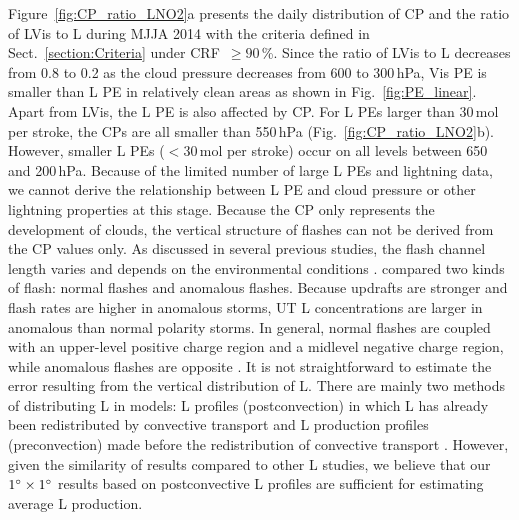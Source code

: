 \documentclass[amt]{copernicus}
\begin{document}
Figure~\ref{fig:CP_ratio_LNO2}a presents the daily distribution of CP and the ratio of LVis to L during MJJA 2014 with the criteria defined in Sect.~\ref{section:Criteria} under CRF~$\geq 90$\,{\%}.
Since the ratio of LVis to L decreases from 0.8 to 0.2 as the cloud pressure decreases from 600 to 300\,hPa, Vis PE is smaller than L PE in relatively clean areas as shown in Fig.~\ref{fig:PE_linear}.
Apart from LVis, the L PE is also affected by CP.
For L PEs larger than 30\,mol per stroke, the CPs are all smaller than 550\,hPa (Fig.~\ref{fig:CP_ratio_LNO2}b).
However, smaller L PEs ($< 30$\,mol per stroke) occur on all levels between 650 and 200\,hPa.
Because of the limited number of large L PEs and lightning data, we cannot derive the relationship between L PE and cloud pressure or other lightning properties at this stage.
Because the CP only represents the development of clouds, the vertical structure of flashes can not be derived from the CP values only.
As discussed in several previous studies, the flash channel length varies and depends on the environmental conditions \citep{Carey.2016,Mecikalski.2017,Fuchs.2018}.
\citet{Davis.2019} compared two kinds of flash: normal flashes and anomalous flashes.
Because updrafts are stronger and flash rates are higher in anomalous storms, UT L concentrations are larger in anomalous than normal polarity storms.
In general, normal flashes are coupled with an upper-level positive charge region and a midlevel negative charge region, while anomalous flashes are opposite \citep{Williams.1989}.
It is not straightforward to estimate the error resulting from the vertical distribution of L.
There are mainly two methods of distributing L in models: L profiles (postconvection) in which L has already been redistributed by convective transport and L production profiles (preconvection) made before the redistribution of convective transport \citep{Allen.2012,Luo.2017}.
However, given the similarity of results compared to other L studies, we believe that our $1{^{\circ}}\times 1{^{\circ}}$ results based on postconvective L profiles are sufficient for estimating average L production.
\end{document}
